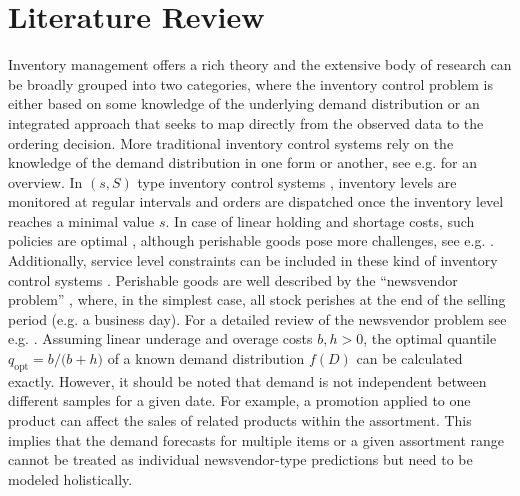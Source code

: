 \documentclass[BCOR=1mm, DIV=calc,10pt,
twoside=true,
twocolumn,
headings=normal]{scrartcl}
\begin{document}
\section{Literature Review}
\label{sec:LitRev}

Inventory management offers a rich theory and the extensive body of research can be broadly grouped into two categories, where the inventory control problem is either based on some knowledge of the underlying demand distribution or an integrated approach that seeks to map directly from the observed data to the ordering decision. More traditional inventory control systems rely on the knowledge of the demand distribution in one form or another, see e.g. \cite{silver1998} for an overview. In $(s,S)$ type inventory control systems \cite{Scarf1958}, inventory levels are monitored at regular intervals and orders are dispatched once the inventory level reaches a minimal value $s$. In case of linear holding and shortage costs, such policies are optimal \cite{Scarf1959}, although perishable goods pose more challenges, see e.g. \cite{Nahmias1973,Nahmias1975,nahmias1978}. Additionally, service level constraints can be included in these kind of inventory control systems \cite{minner2010periodic}. Perishable goods are well described by the ``newsvendor problem'' \cite{Edgeworth}, where, in the simplest case, all stock perishes at the end of the selling period (e.g. a business day). For a detailed review of the newsvendor problem see e.g. \cite{Khouja1999537}. Assuming linear underage and overage costs $b,h >0$, the optimal quantile $q_{\mathrm{opt}} = {b}/{(b+h})$ of a known demand distribution $f(D)$ can be calculated exactly. However, it should be noted that demand is not independent between different samples for a given date. For example, a promotion applied to one product can affect the sales of related products within the assortment. This implies that the demand forecasts for multiple items or a given assortment range cannot be treated as individual newsvendor-type predictions but need to be modeled holistically.
\end{document}
